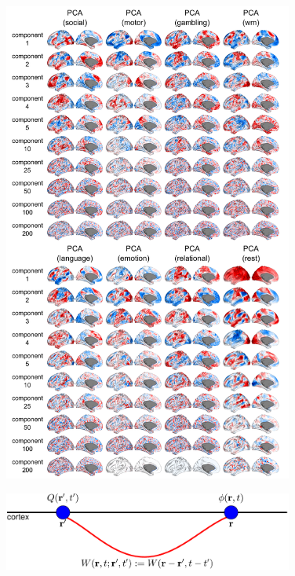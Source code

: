 \documentclass[sn-mathphys-num]{sn-jnl}%
\theoremstyle{thmstyleone}%
\theoremstyle{thmstyletwo}%
\theoremstyle{thmstylethree}%
\begin{document}
\begin{appendices}
\begin{figure}[!htb] 
	\centering
	\includegraphics[width=0.85\textwidth]{fig/supp_9.pdf}
	\caption{
	} \label{fig:supp_9}
\end{figure}



\begin{figure}[!htb] 
	\centering
	\includegraphics[width=0.85\textwidth]{fig/supp_10.pdf}
	\caption{
	} \label{fig:supp_10}
\end{figure}



\end{appendices}
\end{document}
